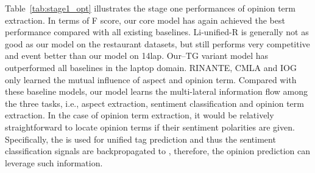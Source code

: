 \documentclass[letterpaper]{article} \usepackage{aaai20}  \usepackage{times}  \usepackage{helvet} \usepackage{courier}  \usepackage[hyphens]{url}  \usepackage{graphicx} \urlstyle{rm} \def\UrlFont{\rm}  \usepackage{graphicx}  \frenchspacing  \setlength{\pdfpagewidth}{8.5in}  \setlength{\pdfpageheight}{11in}
\begin{document}
Table~\ref{tab:stage1_opt} illustrates the stage one performances of opinion term extraction. In terms of F score, our core model has again achieved the best performance compared with all existing baselines. Li-unified-R is generally not as good as our model on the restaurant datasets, but still performs very competitive and event better than our model on 14lap.
Our--TG variant model has outperformed all baselines in the laptop domain. RINANTE, CMLA and IOG only learned the mutual influence of aspect and opinion term. Compared with these baseline models, our model learns the multi-lateral information flow among the three tasks, i.e., aspect extraction, sentiment classification and opinion term extraction. In the case of opinion term extraction, it would be relatively straightforward to locate opinion terms if their sentiment polarities are given. Specifically, the  is used for unified tag prediction and thus the sentiment classification signals are backpropagated to , therefore, the opinion prediction can leverage such information.
\end{document}
